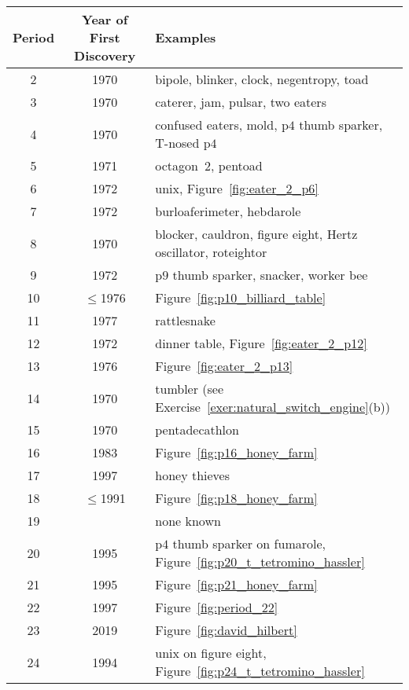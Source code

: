 \begin{table}[!htb]\vspace*{0.05in}
	\begin{center}		
		\begin{tabular}{c c l}
			\toprule
			Period & Year of First Discovery & Examples \\ \midrule
			2 & 1970 & bipole, blinker, clock, negentropy, toad \\
			\rowcolor{gray!20} 3 & 1970 & caterer, jam, pulsar, two eaters \\
			4 & 1970 & confused eaters, mold, p$4$ thumb sparker, T-nosed p$4$ \\
			\rowcolor{gray!20} 5 & 1971 & octagon~2, pentoad \\
			6 & 1972 & unix, Figure~\ref{fig:eater_2_p6} \\
			\rowcolor{gray!20} 7 & 1972 & burloaferimeter, hebdarole \\
			8 & 1970 & blocker, cauldron, figure eight, Hertz oscillator, roteightor \\
			\rowcolor{gray!20} 9 & 1972 & p$9$ thumb sparker, snacker, worker bee \\
			10 & $\leq$1976 & Figure~\ref{fig:p10_billiard_table} \\
			\rowcolor{gray!20} 11 & 1977 & rattlesnake \\
			12 & 1972 & dinner table, Figure~\ref{fig:eater_2_p12} \\
			\rowcolor{gray!20} 13 & 1976 & Figure~\ref{fig:eater_2_p13} \\
			14 & 1970 & tumbler (see Exercise~\ref{exer:natural_switch_engine}(b)) \\
			\rowcolor{gray!20} 15 & 1970 & pentadecathlon \\
			16 & 1983 & Figure~\ref{fig:p16_honey_farm} \\
			\rowcolor{gray!20} 17 & 1997 & honey thieves \\
			18 & $\leq$1991 & Figure~\ref{fig:p18_honey_farm} \\
			\rowcolor{redback!50} 19 & & none known \\
			20 & 1995 & p$4$ thumb sparker on fumarole, Figure~\ref{fig:p20_t_tetromino_hassler} \\
			\rowcolor{gray!20} 21 & 1995 & Figure~\ref{fig:p21_honey_farm} \\
			22 & 1997 & Figure~\ref{fig:period_22} \\
			\rowcolor{gray!20} 23 & 2019 & Figure~\ref{fig:david_hilbert} \\
			24 & 1994 & unix on figure eight, Figure~\ref{fig:p24_t_tetromino_hassler} \\

\end{tabular}
\end{center}
\end{table}
